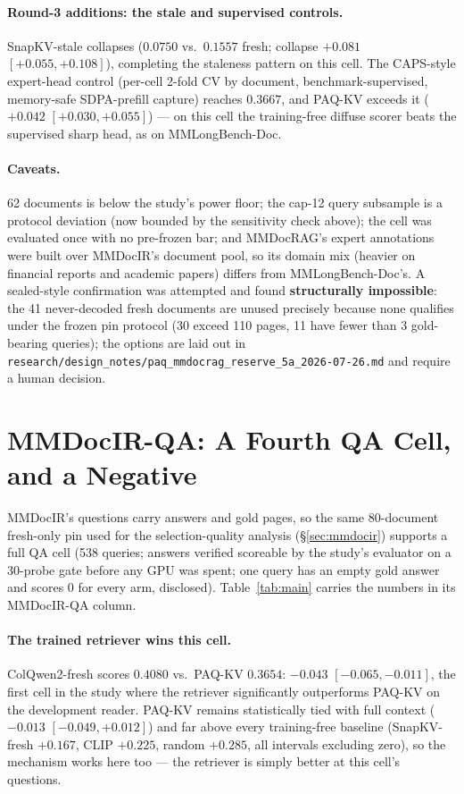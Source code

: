 \documentclass[letterpaper]{article} %
\newcommand{\paqc}{\textsc{PAQ-KV}}
\begin{document}
\paragraph{Round-3 additions: the stale and supervised controls.} SnapKV-stale collapses ($0.0750$ vs.\ $0.1557$ fresh; collapse $+0.081$ $[+0.055,+0.108]$), completing the staleness pattern on this cell. The CAPS-style expert-head control (per-cell 2-fold CV by document, benchmark-supervised, memory-safe SDPA-prefill capture) reaches $0.3667$, and \paqc{} exceeds it ($+0.042$ $[+0.030,+0.055]$) --- on this cell the training-free diffuse scorer beats the supervised sharp head, as on MMLongBench-Doc.

\paragraph{Caveats.} 62 documents is below the study's power floor; the cap-12 query subsample is a protocol deviation (now bounded by the sensitivity check above); the cell was evaluated once with no pre-frozen bar; and MMDocRAG's expert annotations were built over MMDocIR's document pool, so its domain mix (heavier on financial reports and academic papers) differs from MMLongBench-Doc's. A sealed-style confirmation was attempted and found \textbf{structurally impossible}: the 41 never-decoded fresh documents are unused precisely because none qualifies under the frozen pin protocol (30 exceed 110 pages, 11 have fewer than 3 gold-bearing queries); the options are laid out in \texttt{research/design\_notes/paq\_mmdocrag\_reserve\_5a\_2026-07-26.md} and require a human decision.

\section{MMDocIR-QA: A Fourth QA Cell, and a Negative}\label{sec:mmdocirqa}

MMDocIR's questions carry answers and gold pages, so the same 80-document fresh-only pin used for the selection-quality analysis (\S\ref{sec:mmdocir}) supports a full QA cell (538 queries; answers verified scoreable by the study's evaluator on a 30-probe gate before any GPU was spent; one query has an empty gold answer and scores $0$ for every arm, disclosed). Table~\ref{tab:main} carries the numbers in its MMDocIR-QA column.

\paragraph{The trained retriever wins this cell.} ColQwen2-fresh scores $0.4080$ vs.\ \paqc{} $0.3654$: $-0.043$ $[-0.065,-0.011]$, the first cell in the study where the retriever significantly outperforms \paqc{} on the development reader. \paqc{} remains statistically tied with full context ($-0.013$ $[-0.049,+0.012]$) and far above every training-free baseline (SnapKV-fresh $+0.167$, CLIP $+0.225$, random $+0.285$, all intervals excluding zero), so the mechanism works here too --- the retriever is simply better at this cell's questions.
\end{document}
